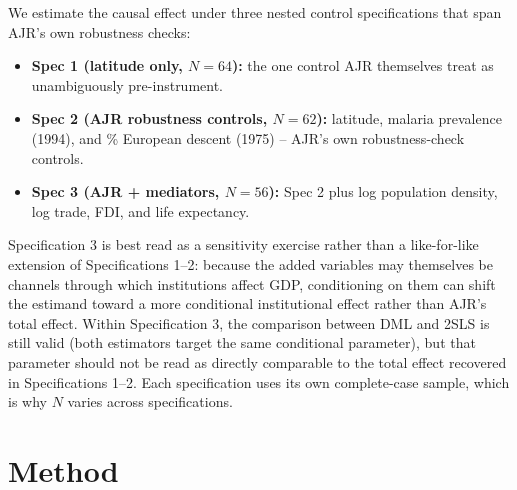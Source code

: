 \documentclass[10pt,twocolumn]{article}
\begin{document}
We estimate the causal effect under three nested control specifications
that span AJR's own robustness checks:
\begin{itemize}
\item \textbf{Spec 1 (latitude only, $N=64$):} the one control AJR
themselves treat as unambiguously pre-instrument.
\item \textbf{Spec 2 (AJR robustness controls, $N=62$):} latitude,
malaria prevalence (1994), and \% European descent (1975) -- AJR's own
robustness-check controls.
\item \textbf{Spec 3 (AJR + mediators, $N=56$):} Spec 2 plus log
population density, log trade, FDI, and life expectancy.
\end{itemize}
Specification 3 is best read as a sensitivity exercise rather than a
like-for-like extension of Specifications 1--2: because the added
variables may themselves be channels through which institutions affect
GDP, conditioning on them can shift the estimand toward a more
conditional institutional effect rather than AJR's total effect. Within
Specification 3, the comparison between DML and 2SLS is still valid
(both estimators target the same conditional parameter), but that
parameter should not be read as directly comparable to the total effect
recovered in Specifications 1--2. Each specification uses its own
complete-case sample, which is why $N$ varies across specifications.

\section{Method}
\end{document}

